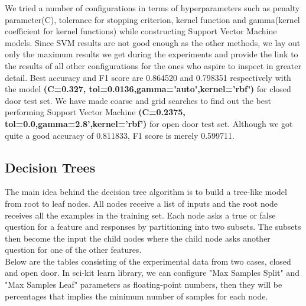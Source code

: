 \documentclass[conference]{IEEEtran}
\begin{document}
We tried a number of configurations in terms of hyperparameters such as penalty parameter(C), tolerance for stopping criterion, kernel function and gamma(kernel coefficient for kernel functions) while constructing Support Vector Machine models. Since SVM results are not good enough as the other methods, we lay out only the maximum results we get during the experiments and provide the link to the results of all other configurations for the ones who aspire to inspect in greater detail. Best accuracy and F1 score are 0.864520 and 0.798351 respectively with the model \textbf{(C=0.327, tol=0.0136,gamma='auto',kernel='rbf')} for closed door test set. We have made coarse and grid searches to find out the best performing Support Vector Machine \textbf{(C=0.2375, tol=0.0,gamma=2.8',kernel='rbf')} for open door test set. Although we got quite a good accuracy of 0.811833, F1 score is merely 0.599711.

\subsection{Decision Trees}
The main idea behind the decision tree algorithm is to build a tree-like model from root to leaf nodes. All nodes receive a list of inputs and the root node receives all the examples in the training set. Each node asks a true or false question for a feature and responses by partitioning into two subsets. The subsets then become the input the child nodes where the child node asks another question for one of the other features.\\

Below are the tables consisting of the experimental data from two cases, closed and open door. In sci-kit learn library, we can configure "Max Samples Split" and "Max Samples Leaf" parameters as floating-point numbers, then they will be percentages that implies the minimum number of samples for each node.
\end{document}
